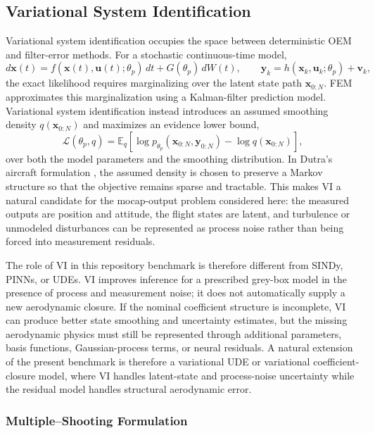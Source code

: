 \documentclass[11pt]{article}
\begin{document}
\subsection{Variational System Identification}
Variational system identification occupies the space between deterministic OEM and filter-error methods. For a stochastic continuous-time model,
\[
d\mathbf{x}(t)=f(\mathbf{x}(t),\mathbf{u}(t);\theta_p)\,dt+G(\theta_p)\,dW(t),
\qquad
\mathbf{y}_k=h(\mathbf{x}_k,\mathbf{u}_k;\theta_p)+\mathbf{v}_k,
\]
the exact likelihood requires marginalizing over the latent state path $\mathbf{x}_{0:N}$. FEM approximates this marginalization using a Kalman-filter prediction model. Variational system identification instead introduces an assumed smoothing density $q(\mathbf{x}_{0:N})$ and maximizes an evidence lower bound,
\[
\mathcal{L}(\theta_p,q)
=
\mathbb{E}_{q}
\left[
\log p_{\theta_p}(\mathbf{x}_{0:N},\mathbf{y}_{0:N})
-\log q(\mathbf{x}_{0:N})
\right],
\]
over both the model parameters and the smoothing distribution. In Dutra's aircraft formulation \citep{dutra_variational_2025}, the assumed density is chosen to preserve a Markov structure so that the objective remains sparse and tractable. This makes VI a natural candidate for the mocap-output problem considered here: the measured outputs are position and attitude, the flight states are latent, and turbulence or unmodeled disturbances can be represented as process noise rather than being forced into measurement residuals.

The role of VI in this repository benchmark is therefore different from SINDy, PINNs, or UDEs. VI improves inference for a prescribed grey-box model in the presence of process and measurement noise; it does not automatically supply a new aerodynamic closure. If the nominal coefficient structure is incomplete, VI can produce better state smoothing and uncertainty estimates, but the missing aerodynamic physics must still be represented through additional parameters, basis functions, Gaussian-process terms, or neural residuals. A natural extension of the present benchmark is therefore a variational UDE or variational coefficient-closure model, where VI handles latent-state and process-noise uncertainty while the residual model handles structural aerodynamic error.

\subsubsection{Multiple--Shooting Formulation}
\end{document}

